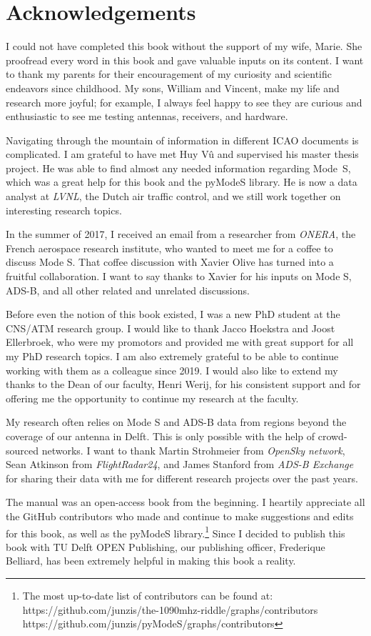 \chapter*{Acknowledgements}

I could not have completed this book without the support of my wife, Marie. She proofread every word in this book and gave valuable inputs on its content. I want to thank my parents for their encouragement of my curiosity and scientific endeavors since childhood. My sons, William and Vincent, make my life and research more joyful; for example, I always feel happy to see they are curious and enthusiastic to see me testing antennas, receivers, and hardware.

Navigating through the mountain of information in different ICAO documents is complicated. I am grateful to have met Huy V\^u and supervised his master thesis project. He was able to find almost any needed information regarding Mode~S, which was a great help for this book and the pyModeS library. He is now a data analyst at \emph{LVNL}, the Dutch air traffic control, and we still work together on interesting research topics. 

In the summer of 2017, I received an email from a researcher from \emph{ONERA}, the French aerospace research institute, who wanted to meet me for a coffee to discuss Mode S. That coffee discussion with Xavier Olive has turned into a fruitful collaboration. I want to say thanks to Xavier for his inputs on Mode S, ADS-B, and all other related and unrelated discussions.

Before even the notion of this book existed, I was a new PhD student at the CNS/ATM research group. I would like to thank Jacco Hoekstra and Joost Ellerbroek, who were my promotors and provided me with great support for all my PhD research topics. I am also extremely grateful to be able to continue working with them as a colleague since 2019. I would also like to extend my thanks to the Dean of our faculty, Henri Werij, for his consistent support and for offering me the opportunity to continue my research at the faculty. 

My research often relies on Mode S and ADS-B data from regions beyond the coverage of our antenna in Delft. This is only possible with the help of crowd-sourced networks. I want to thank Martin Strohmeier from \emph{OpenSky network}, Sean Atkinson from \emph{FlightRadar24}, and James Stanford from \emph{ADS-B Exchange} for sharing their data with me for different research projects over the past years.

The manual was an open-access book from the beginning. I heartily appreciate all the GitHub contributors who made and continue to make suggestions and edits for this book, as well as the pyModeS library.\footnote{The most up-to-date list of contributors can be found at: \\https://github.com/junzis/the-1090mhz-riddle/graphs/contributors \\https://github.com/junzis/pyModeS/graphs/contributors} Since I decided to publish this book with TU Delft OPEN Publishing, our publishing officer, Frederique Belliard, has been extremely helpful in making this book a reality. 